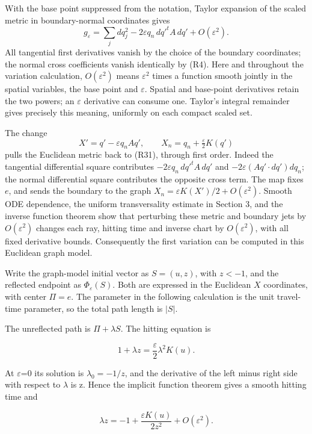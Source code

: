 \documentclass[
  11pt,
]{article}
\begin{document}
With the base point suppressed from the notation, Taylor expansion of
the scaled metric in boundary-normal coordinates gives \[
 g_\varepsilon=\sum_jdq_j^2-2\varepsilon q_n\,dq'^t A\,dq'
                       +O(\varepsilon^2).                  \tag{R31}
\] All tangential first derivatives vanish by the choice of the boundary
coordinates; the normal cross coefficients vanish identically by (R4).
Here and throughout the variation calculation, \(O(\varepsilon^2)\)
means \(\varepsilon^2\) times a function smooth jointly in the spatial
variables, the base point and \(\varepsilon\). Spatial and base-point
derivatives retain the two powers; an \(\varepsilon\) derivative can
consume one. Taylor's integral remainder gives precisely this meaning,
uniformly on each compact scaled set.

The change \[
 X'=q'-\varepsilon q_nAq',\qquad
 X_n=q_n+\tfrac{\varepsilon}{2}K(q')                         \tag{R32}
\] pulls the Euclidean metric back to (R31), through first order. Indeed
the tangential differential square contributes
\(-2\varepsilon q_n\,dq'^tA\,dq'\) and
\(-2\varepsilon(Aq'\cdot dq')dq_n\); the normal differential square
contributes the opposite cross term. The map fixes \(e\), and sends the
boundary to the graph \(X_n=\varepsilon K(X')/2+O(\varepsilon^2)\).
Smooth ODE dependence, the uniform transversality estimate in Section 3,
and the inverse function theorem show that perturbing these metric and
boundary jets by \(O(\varepsilon^2)\) changes each ray, hitting time and
inverse chart by \(O(\varepsilon^2)\), with all fixed derivative bounds.
Consequently the first variation can be computed in this Euclidean graph
model.

Write the graph-model initial vector as \(S=(u,z)\), with \(z<-1\), and
the reflected endpoint as \(\Phi_\varepsilon(S)\). Both are expressed in
the Euclidean \(X\) coordinates, with center \(\Pi=e\). The parameter in
the following calculation is the unit travel-time parameter, so the
total path length is \(|S|\).

The unreflected path is \(\Pi+\lambda S\). The hitting equation is

\[
 1+\lambda z=\frac{\varepsilon}{2}\lambda^2K(u).
\]

At \ensuremath{\varepsilon}=0 its solution is \(\lambda_0=-1/z\), and the derivative of the
left minus right side with respect to \ensuremath{\lambda} is z. Hence the implicit
function theorem gives a smooth hitting time and

\[
 \lambda z=-1+\frac{\varepsilon K(u)}{2z^2}+O(\varepsilon^2).
 \tag{V3}
\]
\end{document}
